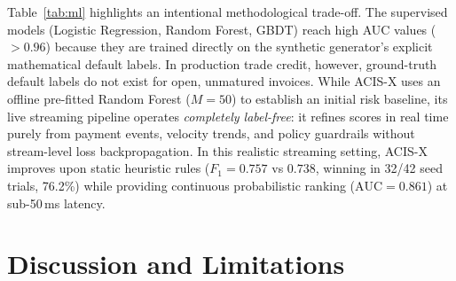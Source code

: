 \documentclass[runningheads]{llncs}
\begin{document}
\begin{table}[htbp]
\caption{Predictive benchmark on synthetic hold-out ($n=500$, 42 seeds, mean $\pm$ std). Supervised models are trained directly on generator ground-truth labels; ACIS-X operates label-free.}
\label{tab:ml}
\centering\scriptsize
{}
\end{table}

Table~\ref{tab:ml} highlights an intentional methodological trade-off. The supervised models (Logistic Regression, Random Forest, GBDT) reach high AUC values ($>0.96$) because they are trained directly on the synthetic generator's explicit mathematical default labels. In production trade credit, however, ground-truth default labels do not exist for open, unmatured invoices. While ACIS-X uses an offline pre-fitted Random Forest ($M=50$) to establish an initial risk baseline, its live streaming pipeline operates \textit{completely label-free}: it refines scores in real time purely from payment events, velocity trends, and policy guardrails without stream-level loss backpropagation. In this realistic streaming setting, ACIS-X improves upon static heuristic rules ($F_1 = 0.757$ vs $0.738$, winning in 32/42 seed trials, 76.2\%) while providing continuous probabilistic ranking ($\text{AUC} = 0.861$) at sub-50\,ms latency.

\section{Discussion and Limitations}
\label{sec:discussion}
\end{document}
